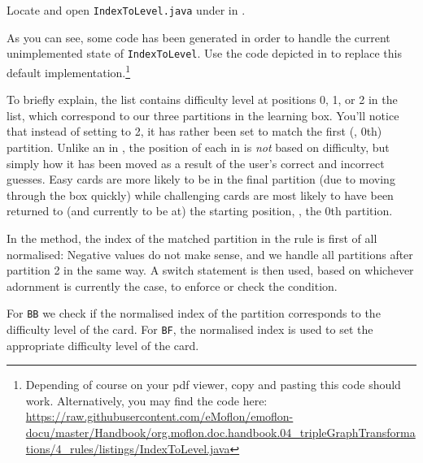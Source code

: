 \begin{stepbystep}
\item Locate and open \texttt{IndexToLevel.java} under  in .

\item As you can see, some code has been generated in order to handle the current unimplemented state of \texttt{IndexToLevel}. 
Use the code depicted in  to replace this default implementation.\footnote{Depending of course on your pdf viewer, copy and pasting this code should work.
Alternatively, you may find the code here: \url{https://raw.githubusercontent.com/eMoflon/emoflon-docu/master/Handbook/org.moflon.doc.handbook.04_tripleGraphTransformations/4_rules/listings/IndexToLevel.java}}



\end{stepbystep}

To briefly explain, the  list contains difficulty level at positions 0, 1, or 2 in the list, which correspond to our three partitions in the learning box. 
You'll notice that instead of setting  to 2, it has rather been set to match the first (\idest, 0th) partition. 
Unlike an  in , the position of each  in  is \emph{not} based on difficulty, but simply how it has been moved as a result of the user's correct and incorrect guesses. 
Easy cards are more likely to be in the final partition (due to moving through the box quickly) while challenging cards are most likely to have been returned to (and currently to be at) the starting position, \idest, the 0th partition.

In the  method, the index of the matched partition in the rule is first of all normalised:
Negative values do not make sense, and we handle all partitions  after partition 2 in the same way.
A switch statement is then used, based on whichever adornment is currently the case, to enforce or check the condition. 

For \texttt{BB} we check if the normalised index of the partition corresponds to the difficulty level of the card.
For \texttt{BF}, the normalised index is used to set the appropriate difficulty level of the card.

